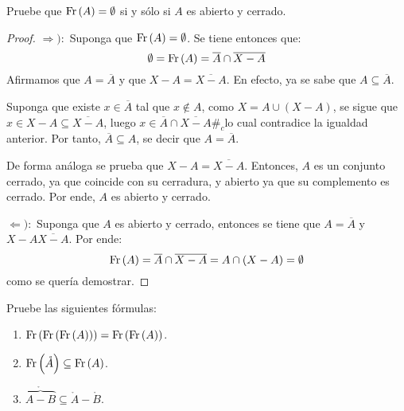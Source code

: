 \documentclass[12pt]{report}
\theoremstyle{largebreak}
\newcommand\contradiction{\ensuremath{\#_c}}
\newcommand{\Int}[1]{\ensuremath{\mathring{#1}}}
\newcommand{\Cls}[1]{\ensuremath{\overline{#1}}}
\newcommand{\Fr}[1]{\ensuremath{\textup{Fr}\left(#1\right)}}
\begin{document}
    \begin{excer}
        Pruebe que $\Fr{A}=\emptyset$ si y sólo si $A$ es abierto y cerrado.
    \end{excer}

    \begin{proof}
        $\Rightarrow):$ Suponga que $\Fr{A}=\emptyset$. Se tiene entonces que:
        \begin{equation*}
            \emptyset = \Fr{A}=\Cls{A}\cap\Cls{X-A}
        \end{equation*}
        Afirmamos que $A=\Cls{A}$ y que $X-A=\Cls{X-A}$. En efecto, ya se sabe que $A\subseteq \Cls{A}$.

        Suponga que existe $x\in\Cls{A}$ tal que $x\notin A$, como $X=A\cup (X-A)$, se sigue que $x\in X-A\subseteq \Cls{X-A}$, luego $x\in \Cls{A}\cap\Cls{X-A}$\contradiction lo cual contradice la igualdad anterior. Por tanto, $\Cls{A}\subseteq A$, se decir que $A=\Cls{A}$.

        De forma análoga se prueba que $X-A=\Cls{X-A}$. Entonces, $A$ es un conjunto cerrado, ya que coincide con su cerradura, y abierto ya que su complemento es cerrado. Por ende, $A$ es abierto y cerrado.

        $\Leftarrow):$ Suponga que $A$ es abierto y cerrado, entonces se tiene que $A=\Cls{A}$ y $X-A\Cls{X-A}$. Por ende:
        \begin{equation*}
            \Fr{A}=\Cls{A}\cap\Cls{X-A}=A\cap(X-A)=\emptyset
        \end{equation*}
        como se quería demostrar.

    \end{proof}

    \begin{excer}
        Pruebe las siguientes fórmulas:
        \begin{enumerate}
            \item $\Fr{\Fr{\Fr{A}}}=\Fr{\Fr{A}}$.
            \item $\Fr{\Int{A}}\subseteq\Fr{A}$.
            \item $\Int{\overbrace{A-B}}\subseteq\Int{A}-\Int{B}$.
        \end{enumerate}
    \end{excer}
\end{document}
